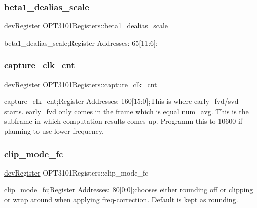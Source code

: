 \subsubsection{\texorpdfstring{beta1\+\_\+dealias\+\_\+scale}{beta1\_dealias\_scale}}
{\footnotesize\ttfamily \mbox{\hyperlink{classdev_register}{dev\+Register}} O\+P\+T3101\+Registers\+::beta1\+\_\+dealias\+\_\+scale}



beta1\+\_\+dealias\+\_\+scale;Register Addresses\+: 65\mbox{[}11\+:6\mbox{]}; 

\mbox{\label{class_o_p_t3101_registers_a5e058ae7244daa3be323daa3282b8171}} 
\subsubsection{\texorpdfstring{capture\+\_\+clk\+\_\+cnt}{capture\_clk\_cnt}}
{\footnotesize\ttfamily \mbox{\hyperlink{classdev_register}{dev\+Register}} O\+P\+T3101\+Registers\+::capture\+\_\+clk\+\_\+cnt}



capture\+\_\+clk\+\_\+cnt;Register Addresses\+: 160\mbox{[}15\+:0\mbox{]};This is where early\+\_\+fvd/svd starts. early\+\_\+fvd only comes in the frame which is equal num\+\_\+avg. This is the subframe in which computation results comes up. Programm this to 10600 if planning to use lower frequency. 

\mbox{\label{class_o_p_t3101_registers_a318a282572480ca224337d59f66ad5d5}} 
\subsubsection{\texorpdfstring{clip\+\_\+mode\+\_\+fc}{clip\_mode\_fc}}
{\footnotesize\ttfamily \mbox{\hyperlink{classdev_register}{dev\+Register}} O\+P\+T3101\+Registers\+::clip\+\_\+mode\+\_\+fc}



clip\+\_\+mode\+\_\+fc;Register Addresses\+: 80\mbox{[}0\+:0\mbox{]};chooses either rounding off or clipping or wrap around when applying freq-\/correction. Default is kept as rounding. 


